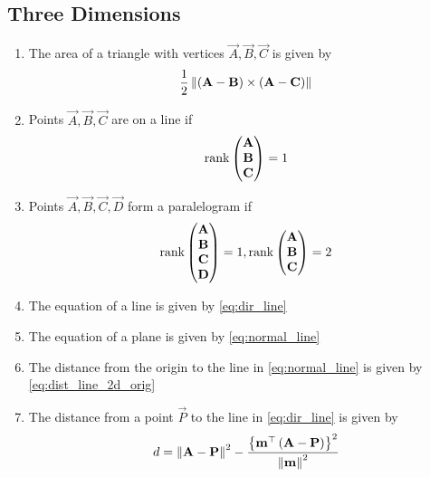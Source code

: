 \documentclass[journal,12pt,twocolumn]{IEEEtran}
\renewcommand\thesection{\arabic{section}}
\renewcommand\thesubsection{\thesection.\arabic{subsection}}
\begin{document}
\subsection{Three Dimensions}
\renewcommand{\theequation}{\theenumi}
\begin{enumerate}[label=\thesubsection.\arabic*.,ref=\thesubsection.\theenumi]
\item The area of a triangle with vertices $\vec{A}, \vec{B}, \vec{C}$ is given by 
\begin{align}
  \label{eq:area3d}
 \frac{1}{2} \left\lVert\left(\mathbf{A} - \mathbf{B}\right) \times \left(\mathbf{A} - \mathbf{C}\right)\right\rVert
\end{align}

\item Points $\vec{A}, \vec{B}, \vec{C}$ are on a line if 
\begin{align}
  \label{eq:line_rank}
  \text{rank}\begin{pmatrix}\mathbf{A} \\ \mathbf{B} \\ \mathbf{C} \end{pmatrix}  = 1
\end{align}
\item Points $\vec{A}, \vec{B}, \vec{C}, \vec{D}$ form a paralelogram if 
\begin{align}
  \label{eq:parallelgm_rank}
  \text{rank}\begin{pmatrix}\mathbf{A} \\ \mathbf{B} \\ \mathbf{C} \\ \mathbf{D}  \end{pmatrix}  = 1, 
  \text{rank}\begin{pmatrix}\mathbf{A} \\ \mathbf{B} \\ \mathbf{C} \end{pmatrix}  = 2
\end{align}
\item The equation of a line  is given by  
	\eqref{eq:dir_line}
	\item The equation of a plane is given by
	\eqref{eq:normal_line}
	\item The distance from the origin to the line  in 
	\eqref{eq:normal_line}
	is given by 
	\eqref{eq:dist_line_2d_orig}
\item The distance from a point $\vec{P}$  to the line in 
	\eqref{eq:dir_line} is given by 
\begin{align}
	\label{dist_3d_def_final}
		d = \left\lVert\mathbf{A} -\mathbf{P}\right\rVert^2 - \frac{\left\{\mathbf{m}^{\top}\left(\mathbf{A}-\mathbf{P} 
	\right)\right\}^2}{\left\lVert\mathbf{m}\right\rVert^2}
		\end{align}

\end{enumerate}
\end{document}
